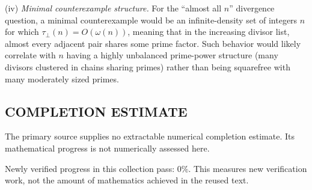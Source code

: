 \smallskip
\noindent
(iv) \emph{Minimal counterexample structure.}
For the ``almost all $n$'' divergence question, a minimal counterexample would be an infinite-density set of integers $n$ for which $\tau_\perp(n)=O(\omega(n))$, meaning that in the increasing divisor list, almost every adjacent pair shares some prime factor. Such behavior would likely correlate with $n$ having a highly unbalanced prime-power structure (many divisors clustered in chains sharing primes) rather than being squarefree with many moderately sized primes.



\subsection*{COMPLETION ESTIMATE}
The primary source supplies no extractable numerical completion estimate. Its mathematical progress is not numerically assessed here.

Newly verified progress in this collection pass: $0\%$. This measures new verification work, not the amount of mathematics achieved in the reused text.
